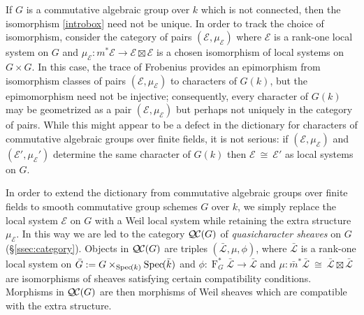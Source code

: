 \documentclass[10pt]{amsart}
\theoremstyle{plain}
\theoremstyle{definition}
\theoremstyle{remark}
\newcommand{\bFq}{\bar{k}}
\newcommand{\Fq}{k}
\newcommand{\Frob}[1]{\operatorname{F}_{#1}}
\newcommand{\Spec}[1]{{\operatorname{Spec}\hskip-1pt( #1 )}}
\newcommand{\iso}{{\ \cong\ }}
\newcommand{\qcs}[1]{{\mathcal{#1}}}
\newcommand{\gqcs}[1]{{\mathcal{\bar #1}}}
\newcommand{\QC}{{\mathcal{Q\hskip-0.8pt C}}}
\begin{document}
If $G$ is a commutative algebraic group over $\Fq$ which is not connected, then the isomorphism \eqref{introbox} need not be unique. In order to track the choice of isomorphism, consider the category of pairs $(\qcs{E},\mu_\qcs{E})$ where $\qcs{E}$ is a rank-one local system on $G$ and $\mu_\qcs{E} : m^*\qcs{E} \to \qcs{E}\boxtimes\qcs{E}$ is a chosen isomorphism of local systems on $G\times G$. 
In this case, the trace of Frobenius provides an epimorphism from isomorphism classes of pairs $(\qcs{E},\mu_\qcs{E})$ to characters of $G(\Fq)$, but the epimomorphism need not be injective; consequently,
every character of $G(\Fq)$ may be geometrized as a pair $(\qcs{E},\mu_\qcs{E})$ but perhaps not uniquely in the category of pairs. 
While this might appear to be a defect in the dictionary for characters of commutative algebraic groups over finite fields, it is not serious: if $(\qcs{E},\mu_\qcs{E})$ and $(\qcs{E}',\mu_\qcs{E}')$ determine the same character of $G(\Fq)$ then $\qcs{E}\iso \qcs{E}'$ as local systems on $G$.

In order to extend the dictionary from commutative algebraic groups over finite fields to smooth commutative group schemes $G$ over $\Fq$,
we simply replace the local system $\qcs{E}$ on $G$ with a Weil local system while retaining the extra structure $\mu_\qcs{E}$. 
In this way we are led to the category $\QC(G)$ of {\it quasicharacter sheaves} on $G$ (\S\ref{ssec:category}).
Objects in $\QC(G)$ are triples $(\gqcs{L}, \mu,\phi)$, where $\gqcs{L}$ is a rank-one local system on ${\bar G} := G\times_{\Spec{\Fq}} \Spec{\bFq}$
and $\phi : \Frob{G}^* \gqcs{L}\to \gqcs{L}$ and $\mu : {\bar m}^* \gqcs{L} \iso \gqcs{L} \boxtimes \gqcs{L}$ are isomorphisms of sheaves satisfying certain compatibility conditions.
Morphisms in $\QC(G)$ are then morphisms of Weil sheaves which are compatible with the extra structure.
\end{document}
